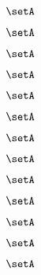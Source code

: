 \begin{forslides}
    \begin{equation}
        \label{eq:slides-translation-40}
        \setA
    \end{equation}

    \begin{equation}
        \label{eq:slides-translation-41}
        \setA
    \end{equation}

    \begin{equation}
        \label{eq:slides-translation-42}
        \setA
    \end{equation}

    \begin{equation}
        \label{eq:slides-translation-43}
        \setA
    \end{equation}

    \begin{equation}
        \label{eq:slides-translation-44}
        \setA
    \end{equation}

    \begin{equation}
        \label{eq:slides-translation-45}
        \setA
    \end{equation}

    \begin{equation}
        \label{eq:slides-translation-46}
        \setA
    \end{equation}

    \begin{equation}
        \label{eq:slides-translation-47}
        \setA
    \end{equation}

    \begin{equation}
        \label{eq:slides-translation-48}
        \setA
    \end{equation}

    \begin{equation}
        \label{eq:slides-translation-49}
        \setA
    \end{equation}

    \begin{equation}
        \label{eq:slides-translation-50}
        \setA
    \end{equation}

    \begin{equation}
        \label{eq:slides-translation-51}
        \setA
    \end{equation}

    \begin{equation}
        \label{eq:slides-translation-52}
        \setA
    \end{equation}


\end{forslides}
